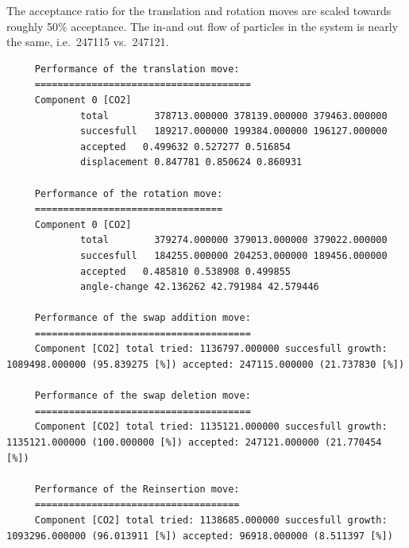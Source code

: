 \noindent
The acceptance ratio for the translation and rotation moves are scaled towards roughly 50\% acceptance.
The in-and out flow of particles in the system is nearly the same, i.e.\ 247115 vs.\ 247121.
\begin{tiny}
\begin{verbatim}
     Performance of the translation move:
     ======================================
     Component 0 [CO2]
             total        378713.000000 378139.000000 379463.000000
             succesfull   189217.000000 199384.000000 196127.000000
             accepted   0.499632 0.527277 0.516854
             displacement 0.847781 0.850624 0.860931
     
     Performance of the rotation move:
     =================================
     Component 0 [CO2]
             total        379274.000000 379013.000000 379022.000000
             succesfull   184255.000000 204253.000000 189456.000000
             accepted   0.485810 0.538908 0.499855
             angle-change 42.136262 42.791984 42.579446
     
     Performance of the swap addition move:
     ======================================
     Component [CO2] total tried: 1136797.000000 succesfull growth: 1089498.000000 (95.839275 [%]) accepted: 247115.000000 (21.737830 [%])
     
     Performance of the swap deletion move:
     ======================================
     Component [CO2] total tried: 1135121.000000 succesfull growth: 1135121.000000 (100.000000 [%]) accepted: 247121.000000 (21.770454 [%])
     
     Performance of the Reinsertion move:
     ====================================
     Component [CO2] total tried: 1138685.000000 succesfull growth: 1093296.000000 (96.013911 [%]) accepted: 96918.000000 (8.511397 [%])
\end{verbatim}
\end{tiny}

